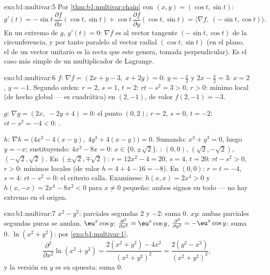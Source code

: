 \begin{solution}{exo:b1:multivar:5}
Por \cref{thm:b1:multivar:chain} con $(x, y) = (\cos t, \sin t)$:
\[
g'(t) = -\sin t\,\frac{\partial f}{\partial x}(\cos t, \sin t)
+ \cos t\,\frac{\partial f}{\partial y}(\cos t, \sin t)
= \bigl\langle \nabla f,\ (-\sin t, \cos t)\bigr\rangle .
\]
En un extremo de $g$, $g'(t) = 0$: $\nabla f$ es  al
vector tangente $(-\sin t, \cos t)$ de la circunferencia, y por tanto paralelo al
vector radial $(\cos t, \sin t)$ (en el plano, el  de un vector unitario es la recta que este genera, tomada
perpendicular). Es el caso más simple de un multiplicador de
Lagrange.
\end{solution}

\begin{solution}{exo:b1:multivar:6}
$f$: $\nabla f = (2x + y - 3,\; x + 2y) = 0$: $y = -\frac x2$ y
$2x - \frac x2 = 3$: $x = 2$, $y = -1$. Segundo orden: $r = 2$, $s =
1$, $t = 2$: $rt - s^2 = 3 > 0$, $r > 0$: mínimo local (de hecho global ---
es cuadrática) en $(2, -1)$, de valor $f(2,-1) = -3$.

$g$: $\nabla g = (2x,\; -2y + 4) = 0$: el punto $(0, 2)$; $r = 2$, $s
= 0$, $t = -2$: $rt - s^2 = -4 < 0$: .

$h$: $\nabla h = \bigl(4x^3 - 4(x - y),\; 4y^3 + 4(x-y)\bigr) = 0$.
Sumando: $x^3 + y^3 = 0$, luego $y = -x$; sustituyendo: $4x^3 - 8x = 0$:
$x \in \{0, \pm\sqrt2\}$. : $(0,0)$,
$(\sqrt2, -\sqrt2)$, $(-\sqrt2, \sqrt2)$.
En $(\pm\sqrt2, \mp\sqrt2)$: $r = 12x^2 - 4 = 20$, $s = 4$, $t =
20$: $rt - s^2 > 0$, $r > 0$: mínimos locales (de valor $h = 4 + 4 - 16 =
-8$). En $(0,0)$: $r = t = -4$, $s = 4$: $rt - s^2 = 0$: el criterio calla.
Examínese: $h(x, x) = 2x^4 > 0$ y $h(x, -x) = 2x^4 - 8x^2 < 0$ para
$x \neq 0$ pequeño: ambos signos en todo  --- no hay extremo
en el origen.
\end{solution}

\begin{solution}{exo:b1:multivar:7}
$x^2 - y^2$: parciales segundas $2$ y $-2$: suma $0$. $xy$: ambas
parciales segundas puras se anulan. $\eu^x\cos y$: $\frac{\partial^2}{\partial
x^2} = \eu^x\cos y$, $\frac{\partial^2}{\partial y^2} =
-\eu^x\cos y$: suma $0$. $\ln(x^2+y^2)$: por
\cref{exo:b1:multivar:1},
\[
\frac{\partial^2}{\partial x^2}\ln(x^2+y^2)
= \frac{2(x^2+y^2) - 4x^2}{(x^2+y^2)^2}
= \frac{2(y^2 - x^2)}{(x^2+y^2)^2},
\]
y la versión en $y$ es su opuesta: suma $0$.
\end{solution}

